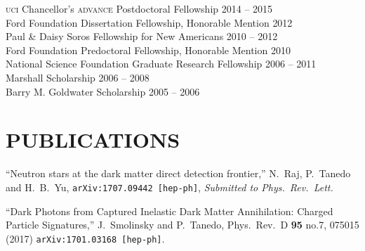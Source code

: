 \documentclass[margin,line]{resume}
\newcommand{\mydate}{}
\newcommand{\scap}[1]{\textsc{\MakeLowercase{#1}}}
\begin{document}
\begin{resume}
\scap{UCI} Chancellor's \scap{ADVANCE} Postdoctoral Fellowship%
\hfill%
	{\mydate 
2014 -- 2015
}\vspace{.7mm}\\
%
Ford Foundation Dissertation Fellowship, Honorable Mention 
\hfill%
{\mydate
2012
}\vspace{.7mm}\\
%
Paul \& Daisy Soros Fellowship for New Americans
\hfill%
{\mydate
2010 -- 2012
}\vspace{.7mm}\\
%
Ford Foundation Predoctoral Fellowship, Honorable Mention 
\hfill%
{\mydate
2010
}\vspace{.7mm}\\
%
National Science Foundation Graduate Research Fellowship
\hfill
{\mydate
2006 -- 2011
}\vspace{.7mm}\\
%
Marshall Scholarship
\hfill
{\mydate
2006 -- 2008
}\vspace{.7mm}\\
%
Barry M. Goldwater Scholarship
\hfill
{\mydate
2005 -- 2006
}\vspace{.7mm}\\    
\vspace{-6mm}


%
\section{\footnotesize \sc
\sffamily 
{}PUBLICATIONS
}


``Neutron stars at the dark matter direct detection frontier,''
  N.~Raj, P.~Tanedo and H.~B.~Yu,
    \texttt{arXiv:1707.09442 [hep-ph]},
  \emph{Submitted to Phys.~Rev.~Lett.}
   \vspace{-2mm}

  ``Dark Photons from Captured Inelastic Dark Matter Annihilation: Charged Particle Signatures,''
  J.~Smolinsky and P.~Tanedo,
  Phys.\ Rev.\ D {\bf 95} no.7,  075015 (2017)
  \texttt{arXiv:1701.03168 [hep-ph]}.  %
  \vspace{-2mm}


\end{resume}
\end{document}
